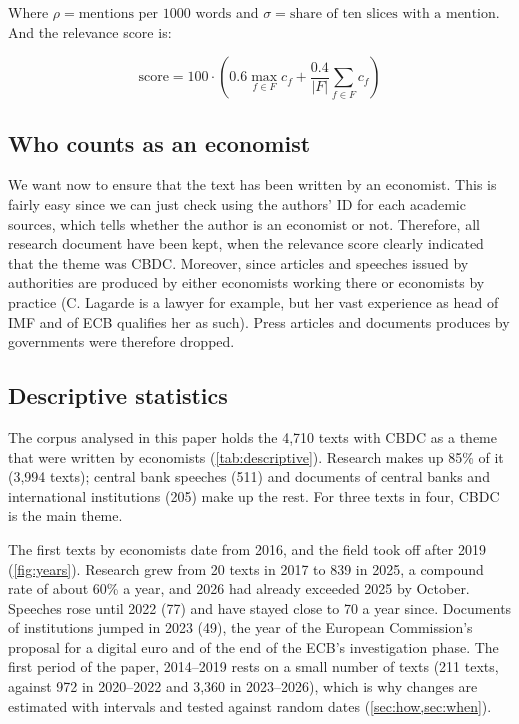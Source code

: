 \documentclass[11pt,a4paper]{article}
\begin{document}
Where $\rho = \text{mentions per 1000 words}$ and
$\sigma = \text{share of ten slices with a mention}$. And the relevance score is:

\begin{equation}
  \text{score}= 100 \cdot \left(0.6 \max_{f\in F}c_f + \frac{0.4}{\vert 
  F \vert} \sum_{f\in F} c_f\right)
\end{equation}

\subsection{Who counts as an economist}

We want now to ensure that the text has been written by an economist. This is
fairly easy since we can just check using the authors' ID for each academic
sources, which tells whether the author is an economist or not. Therefore,
all research document have been kept, when the relevance score clearly
indicated that the theme was CBDC. Moreover, since articles and speeches
issued by authorities are produced by either economists working there or 
economists by practice (C. Lagarde is a lawyer for example, but her vast 
experience as head of IMF and of ECB qualifies her as such). Press
articles and documents produces by governments were therefore dropped.


\subsection{Descriptive statistics}

The corpus analysed in this paper holds the 4{,}710 texts with CBDC as a 
theme that were written by economists (\cref{tab:descriptive}). Research 
makes up 85\% of it (3{,}994 texts); central bank speeches (511) and documents 
of central banks and international institutions (205) make up the rest. For 
three texts in four, CBDC is the main theme.

The first texts by 
economists date from 2016, and the field took off after 2019 (\cref{fig:years}). 
Research grew from 20 texts in 2017 to 839 in 2025, a compound rate of 
about 60\% a year, and 2026 had already exceeded 2025 by October. Speeches 
rose until 2022 (77) and have stayed close to 
70 a year since. Documents of institutions jumped in 2023 (49), the year of 
the European Commission's proposal for a digital euro and of the end of 
the ECB's investigation phase. The first period of the paper, 2014--2019 
rests on a small number of texts (211 texts, against 972 in 
2020--2022 and 3{,}360 in 2023--2026), which is 
why changes are estimated with intervals and tested against random dates 
(\cref{sec:how,sec:when}).
\end{document}
